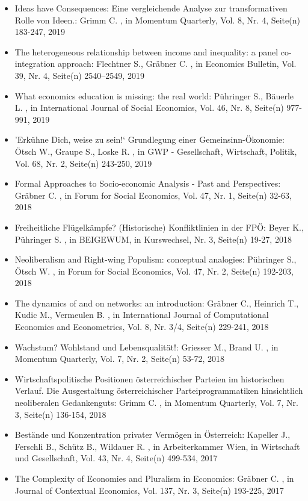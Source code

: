 \begin{itemize}
\item Ideas have Consequences: Eine vergleichende Analyse zur transformativen Rolle von Ideen.: Grimm C. , in Momentum Quarterly, Vol. 8, Nr. 4, Seite(n) 183-247, 2019
\item The heterogeneous relationship between income and inequality: a panel co-integration approach: Flechtner S., Gräbner C. , in Economics Bulletin, Vol. 39, Nr. 4, Seite(n) 2540–2549, 2019
\item What economics education is missing: the real world: Pühringer S., Bäuerle L. , in International Journal of Social Economics, Vol. 46, Nr. 8, Seite(n) 977-991, 2019
\item ’Erkühne Dich, weise zu sein!‘ Grundlegung einer Gemeinsinn-Ökonomie: Ötsch W., Graupe S., Loske R. , in GWP - Gesellschaft, Wirtschaft, Politik, Vol. 68, Nr. 2, Seite(n) 243-250, 2019
\item Formal Approaches to Socio-economic Analysis - Past and Perspectives: Gräbner C. , in Forum for Social Economics, Vol. 47, Nr. 1, Seite(n) 32-63, 2018
\item Freiheitliche Flügelkämpfe? (Historische) Konfliktlinien in der FPÖ: Beyer K., Pühringer S. , in BEIGEWUM, in Kurswechsel, Nr. 3, Seite(n) 19-27, 2018
\item Neoliberalism and Right-wing Populism: conceptual analogies: Pühringer S., Ötsch W. , in Forum for Social Economics, Vol. 47, Nr. 2, Seite(n) 192-203, 2018
\item The dynamics of and on networks: an introduction: Gräbner C., Heinrich T., Kudic M., Vermeulen B. , in International Journal of Computational Economics and Econometrics, Vol. 8, Nr. 3/4, Seite(n) 229-241, 2018
\item Wachstum? Wohlstand und Lebensqualität!: Griesser M., Brand U. , in Momentum Quarterly, Vol. 7, Nr. 2, Seite(n) 53-72, 2018
\item Wirtschaftspolitische Positionen österreichischer Parteien im historischen Verlauf. Die Ausgestaltung österreichischer Parteiprogrammatiken hinsichtlich neoliberalen Gedankenguts: Grimm C. , in Momentum Quarterly, Vol. 7, Nr. 3, Seite(n) 136-154, 2018
\item Bestände und Konzentration privater Vermögen in Österreich: Kapeller J., Ferschli B., Schütz B., Wildauer R. , in Arbeiterkammer Wien, in Wirtschaft und Gesellschaft, Vol. 43, Nr. 4, Seite(n) 499-534, 2017
\item The Complexity of Economies and Pluralism in Economics: Gräbner C. , in Journal of Contextual Economics, Vol. 137, Nr. 3, Seite(n) 193-225, 2017

\end{itemize}
